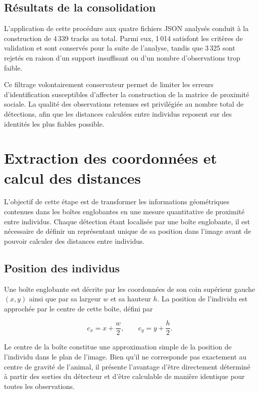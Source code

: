 \documentclass[11pt,a4paper]{report}
\begin{document}
\subsection*{Résultats de la consolidation}

L'application de cette procédure aux quatre fichiers JSON analysés conduit à la
construction de 4\,339 tracks au total. Parmi eux, 1\,014 satisfont les critères
de validation et sont conservés pour la suite de l'analyse, tandis que
3\,325 sont rejetés en raison d'un support insuffisant ou d'un nombre
d'observations trop faible.

Ce filtrage volontairement conservateur permet de limiter les erreurs
d'identification susceptibles d'affecter la construction de la matrice de
proximité sociale. La qualité des observations retenues est privilégiée au
nombre total de détections, afin que les distances calculées entre individus
reposent sur des identités les plus fiables possible.


\section{Extraction des coordonnées et calcul des distances}
\label{sec:distances}

L'objectif de cette étape est de transformer les informations géométriques
contenues dans les boîtes englobantes en une mesure quantitative de proximité
entre individus. Chaque détection étant localisée par une boîte englobante, il
est nécessaire de définir un représentant unique de sa position dans l'image
avant de pouvoir calculer des distances entre individus.

\subsection*{Position des individus}

Une boîte englobante est décrite par les coordonnées de son coin supérieur
gauche $(x,y)$ ainsi que par sa largeur $w$ et sa hauteur $h$. La position de
l'individu est approchée par le centre de cette boîte, défini par

\begin{equation}
c_x=x+\frac{w}{2},
\qquad
c_y=y+\frac{h}{2}.
\end{equation}

Le centre de la boîte constitue une approximation simple de la position de
l'individu dans le plan de l'image. Bien qu'il ne corresponde pas exactement au
centre de gravité de l'animal, il présente l'avantage d'être directement
déterminé à partir des sorties du détecteur et d'être calculable de manière
identique pour toutes les observations.
\end{document}
